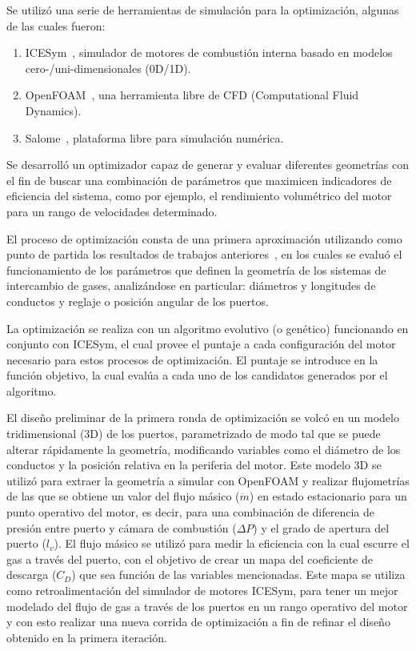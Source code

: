 Se utilizó una serie de herramientas de simulación para la optimización, algunas
de las cuales fueron:

\begin{enumerate}
    \item ICESym~\parencite{icesym}, simulador de motores de combustión interna basado en modelos cero-/uni-dimensionales (0D/1D).
    \item OpenFOAM~\parencite{openfoam}, una herramienta libre de CFD (Computational Fluid Dynamics).
    \item Salome~\parencite{salome}, plataforma libre para simulación numérica.
\end{enumerate}


Se desarrolló un optimizador capaz de generar y evaluar diferentes geometrías
con el fin de buscar una combinación de parámetros que maximicen indicadores de
eficiencia del sistema, como por ejemplo, el rendimiento volumétrico del motor
para un rango de velocidades determinado.

El proceso de optimización consta de una primera aproximación utilizando como
punto de partida los resultados de trabajos anteriores~\parencite{lopez13}, en
los cuales se evaluó el funcionamiento de los parámetros que definen la
geometría de los sistemas de intercambio de gases, analizándose en particular:
diámetros y longitudes de conductos y reglaje o posición angular de los puertos.

La optimización se realiza con un algoritmo evolutivo (o genético) funcionando
en conjunto con ICESym, el cual provee el puntaje a cada configuración del
motor necesario para estos procesos de optimización.
%
El puntaje se introduce en la función objetivo, la cual evalúa a cada uno de los
candidatos generados por el algoritmo.

El diseño preliminar de la primera ronda de optimización se volcó en un modelo
tridimensional (3D) de los puertos, parametrizado de modo tal que se puede
alterar rápidamente la geometría, modificando variables como el diámetro de los
conductos y la posición relativa en la periferia del motor.
%
Este modelo 3D se utilizó para extraer la geometría a simular con OpenFOAM y
realizar flujometrías de las que se obtiene un valor del flujo másico
($\dot{m}$) en estado estacionario para un punto operativo del motor, es decir,
para una combinación de diferencia de presión entre puerto y cámara de
combustión ($\Delta P$) y el grado de apertura del puerto ($l_{v}$).
%
El flujo másico se utilizó para medir la eficiencia con la cual escurre el gas a
través del puerto, con el objetivo de crear un mapa del coeficiente de descarga
($C_{D}$) que sea función de las variables mencionadas.
%
Este mapa se utiliza como retroalimentación del simulador de motores ICESym,
para tener un mejor modelado del flujo de gas a través de los puertos en un
rango operativo del motor y con esto realizar una nueva corrida de optimización
a fin de refinar el diseño obtenido en la primera iteración.
%

